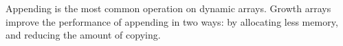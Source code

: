 \HdrDescription

Appending is the most common operation on dynamic arrays. Growth arrays improve the performance of appending in two ways: by allocating less memory, and reducing the amount of copying.
